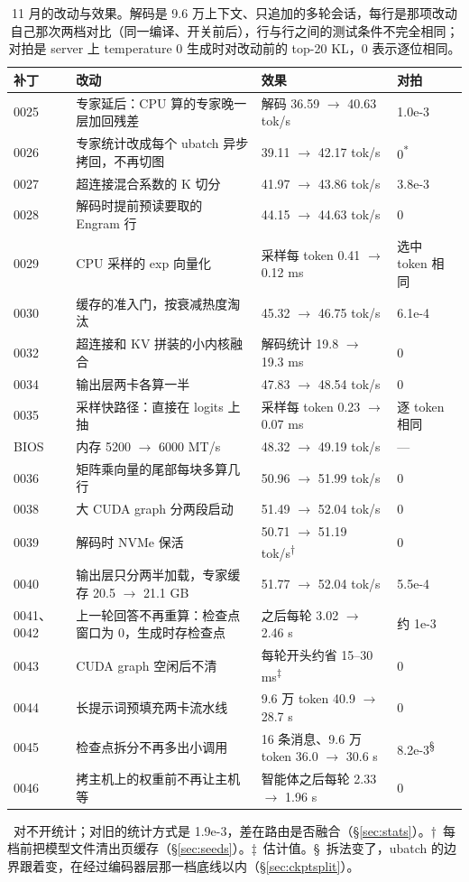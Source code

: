 \documentclass[11pt,a4paper]{article}
\newcommand{\tps}{tok/s}
\begin{document}
\begin{table}[!tp]
  \centering
  \small
  \caption{11 月的改动与效果。解码是 9.6 万上下文、只追加的多轮会话，每行是那项改动自己那次两档对比（同一编译、开关前后），行与行之间的测试条件不完全相同；对拍是 server 上 temperature 0 生成时对改动前的 top-20 KL，0 表示逐位相同。}
  \label{tab:summary2}
  \begin{tabularx}{\textwidth}{@{}l X l l@{}}
    \toprule
    补丁 & 改动 & 效果 & 对拍 \\
    \midrule
    0025 & 专家延后：CPU 算的专家晚一层加回残差 & 解码 36.59 $\to$ 40.63 \tps{} & 1.0e-3 \\
    0026 & 专家统计改成每个 ubatch 异步拷回，不再切图 & 39.11 $\to$ 42.17 \tps{} & 0\textsuperscript{*} \\
    0027 & 超连接混合系数的 K 切分 & 41.97 $\to$ 43.86 \tps{} & 3.8e-3 \\
    0028 & 解码时提前预读要取的 Engram 行 & 44.15 $\to$ 44.63 \tps{} & 0 \\
    0029 & CPU 采样的 exp 向量化 & 采样每 token 0.41 $\to$ 0.12 ms & 选中 token 相同 \\
    0030 & 缓存的准入门，按衰减热度淘汰 & 45.32 $\to$ 46.75 \tps{} & 6.1e-4 \\
    0032 & 超连接和 KV 拼装的小内核融合 & 解码统计 19.8 $\to$ 19.3 ms & 0 \\
    0034 & 输出层两卡各算一半 & 47.83 $\to$ 48.54 \tps{} & 0 \\
    0035 & 采样快路径：直接在 logits 上抽 & 采样每 token 0.23 $\to$ 0.07 ms & 逐 token 相同 \\
    BIOS & 内存 5200 $\to$ 6000 MT/s & 48.32 $\to$ 49.19 \tps{} & — \\
    0036 & 矩阵乘向量的尾部每块多算几行 & 50.96 $\to$ 51.99 \tps{} & 0 \\
    0038 & 大 CUDA graph 分两段启动 & 51.49 $\to$ 52.04 \tps{} & 0 \\
    0039 & 解码时 NVMe 保活 & 50.71 $\to$ 51.19 \tps{}\textsuperscript{†} & 0 \\
    0040 & 输出层只分两半加载，专家缓存 20.5 $\to$ 21.1 GB & 51.77 $\to$ 52.04 \tps{} & 5.5e-4 \\
    0041、0042 & 上一轮回答不再重算：检查点窗口为 0，生成时存检查点 & 之后每轮 3.02 $\to$ 2.46 s & 约 1e-3 \\
    0043 & CUDA graph 空闲后不清 & 每轮开头约省 15--30 ms\textsuperscript{‡} & 0 \\
    0044 & 长提示词预填充两卡流水线 & 9.6 万 token 40.9 $\to$ 28.7 s & 0 \\
    0045 & 检查点拆分不再多出小调用 & 16 条消息、9.6 万 token 36.0 $\to$ 30.6 s & 8.2e-3\textsuperscript{§} \\
    0046 & 拷主机上的权重前不再让主机等 & 智能体之后每轮 2.33 $\to$ 1.96 s & 0 \\
    \bottomrule
  \end{tabularx}
  \par\smallskip\raggedright\footnotesize *\ 对不开统计；对旧的统计方式是 1.9e-3，差在路由是否融合（\S\ref{sec:stats}）。†\ 每档前把模型文件清出页缓存（\S\ref{sec:seeds}）。‡\ 估计值。§\ 拆法变了，ubatch 的边界跟着变，在经过编码器层那一档底线以内（\S\ref{sec:ckptsplit}）。
\end{table}
\end{document}
